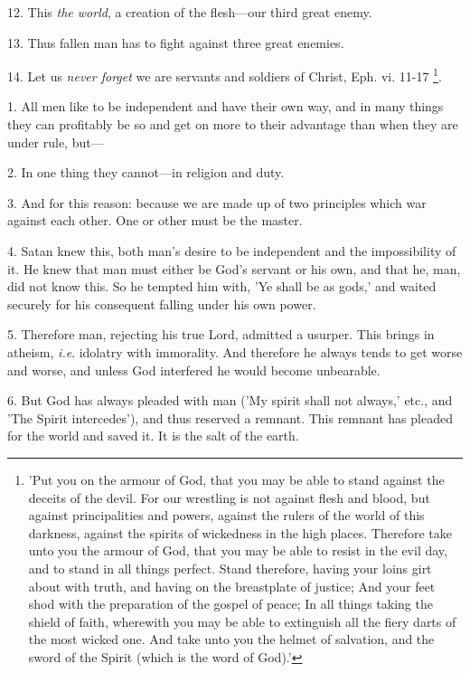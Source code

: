 12. This \emph{the world}, a creation of the
flesh—our third great enemy.

13. Thus fallen man has to fight against three
great enemies.

14. Let us \emph{never forget} we are servants
and soldiers of Christ, Eph. vi. 11-17 \footnote{'Put you on the armour
of God, that you may be able to stand against the deceits of the
devil. For our wrestling is not against flesh and blood, but against
principalities and powers, against the rulers of the world of this
darkness, against the spirits of wickedness in the high places.
Therefore take unto you the armour of God, that you may be able to
resist in the evil day, and to stand in all things perfect. Stand
therefore, having your loins girt about with truth, and having on the
breastplate of justice; And your feet shod with the preparation of the
gospel of peace; In all things taking the shield of faith, wherewith
you may be able to extinguish all the fiery darts of the most wicked
one. And take unto you the helmet of salvation, and the sword of the
Spirit (which is the word of God).'}.


1. All men like to be independent and have their
own way, and in many things they can profitably be so and get on more
to their advantage than when they are under rule, but—

2. In one thing they cannot—in religion and
duty.

3. And for this reason: because we are made up of
two principles which war against each other. One or other must be the
master.

4. Satan knew this, both man's desire to be
independent and the impossibility of it. He knew that man must either
be God's servant or his own, and that he, man, did not know this. So
he tempted him with, 'Ye shall be as gods,' and waited securely for
his consequent falling under his own power.

5. Therefore man, rejecting his true Lord,
admitted a usurper. This brings in atheism, \emph{i.e}. idolatry with
immorality. And therefore he always tends to get worse and worse, and
unless God interfered he would become unbearable.

6. But God has always pleaded with man ('My
spirit shall not always,' etc., and 'The Spirit intercedes'), and thus
reserved a remnant. This remnant has pleaded for the world and saved
it. It is the salt of the earth.

